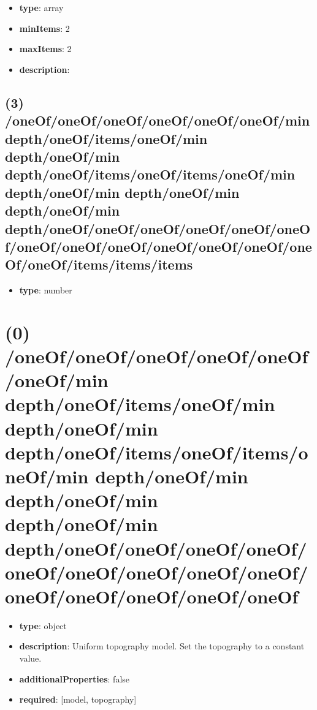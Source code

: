\begin{itemize}[leftmargin=2em]\item {\bf type}: array
\item {\bf minItems}: 2
\item {\bf maxItems}: 2
\item {\bf description}: 
\end{itemize}\subsection{(3) /oneOf/oneOf/oneOf/oneOf/oneOf/oneOf/min depth/oneOf/items/oneOf/min depth/oneOf/min depth/oneOf/items/oneOf/items/oneOf/min depth/oneOf/min depth/oneOf/min depth/oneOf/min depth/oneOf/oneOf/oneOf/oneOf/oneOf/oneOf/oneOf/oneOf/oneOf/oneOf/oneOf/oneOf/oneOf/oneOf/items/items/items}
\begin{itemize}[leftmargin=3em]\item {\bf type}: number
\end{itemize}\section{(0) /oneOf/oneOf/oneOf/oneOf/oneOf/oneOf/min depth/oneOf/items/oneOf/min depth/oneOf/min depth/oneOf/items/oneOf/items/oneOf/min depth/oneOf/min depth/oneOf/min depth/oneOf/min depth/oneOf/oneOf/oneOf/oneOf/oneOf/oneOf/oneOf/oneOf/oneOf/oneOf/oneOf/oneOf/oneOf/oneOf}
\begin{itemize}[leftmargin=0em]\item {\bf type}: object
\item {\bf description}: Uniform topography model. Set the topography to a constant value.
\item {\bf additionalProperties}: false
\item {\bf required}: [model, topography]\end{itemize}
